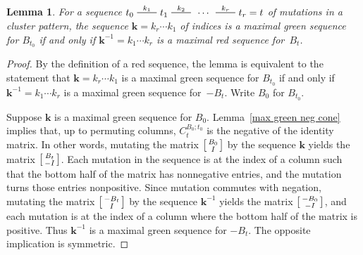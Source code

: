 \documentclass{amsart}
\newtheorem{lemma}[proposition]{Lemma}
\theoremstyle{definition}
\theoremstyle{remark}
\numberwithin{equation}{section}
\newcommand{\edge}{\,\,\rule[2.7pt]{20pt}{0.5pt}\,\,}
\newcommand{\I}{{\mathcal I}}
\newcommand{\0}{{\mathbf{0}}}
\newcommand{\kk}{{\boldsymbol{k}}}
\begin{document}
\begin{lemma}\label{max red green}
For a sequence $t_0\overset{k_1}{\edge}t_1\overset{k_2}{\edge}\,\cdots\,\overset{k_r}{\edge}t_r=t$ of mutations in a cluster pattern, the sequence $\kk=k_r\cdots k_1$ of indices is a maximal green sequence for $B_{t_0}$ if and only if $\kk^{-1}=k_1\cdots k_r$ is a maximal red sequence for~$B_t$.
\end{lemma}
\begin{proof}
By the definition of a red sequence, the lemma is equivalent to the statement that  $\kk=k_r\cdots k_1$ is a maximal green sequence for $B_{t_0}$ if and only if $\kk^{-1}=k_1\cdots k_r$ is a maximal green sequence for~$-B_t$.
Write $B_0$ for $B_{t_0}$.

Suppose $\kk$ is a maximal green sequence for $B_0$.
Lemma~\ref{max green neg cone} implies that, up to permuting columns, $C_t^{B_0;t_0}$ is the negative of the identity matrix.
In other words, mutating the matrix $\begin{bsmallmatrix}B_0\\I\end{bsmallmatrix}$ by the sequence $\kk$ yields the matrix $\begin{bsmallmatrix}B_t\\-I\end{bsmallmatrix}$.
Each mutation in the sequence is at the index of a column such that the bottom half of the matrix has nonnegative entries, and the mutation turns those entries nonpositive.
Since mutation commutes with negation, mutating the matrix $\begin{bsmallmatrix}-B_t\\I\end{bsmallmatrix}$ by the sequence $\kk^{-1}$ yields the matrix $\begin{bsmallmatrix}-B_0\\-I\end{bsmallmatrix}$, and each mutation is at the index of a column where the bottom half of the matrix is positive.
Thus $\kk^{-1}$ is a maximal green sequence for $-B_t$.
The opposite implication is symmetric.
\end{proof}
\end{document}
